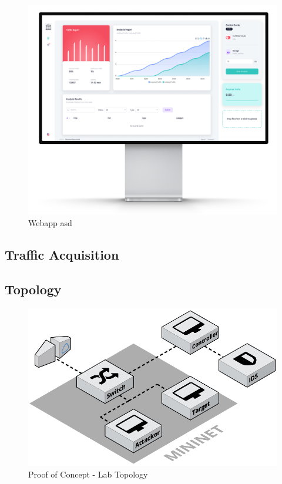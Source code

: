 \begin{figure}[h!]
    \centering
    \includegraphics[scale=0.35]{assets/figures/chapter3/gui-mockup.png}
    \caption{Webapp asd}
    \label{fig:gui-mockup}
\end{figure}


\subsection{Traffic Acquisition}
\label{subsec:traffic-acquisition}

\textcolor{dimgray}{\lipsum[1-6]}


\subsection{Topology}
\label{subsec:topology}

\textcolor{dimgray}{\lipsum[1]}

\begin{figure}[h!]
    \centering
    \includegraphics[scale=0.27]{assets/figures/chapter3/PoC_topology.png}
    \caption{Proof of Concept - Lab Topology}
    \label{fig:poc-topology}
\end{figure}

\textcolor{dimgray}{\lipsum[1]}
